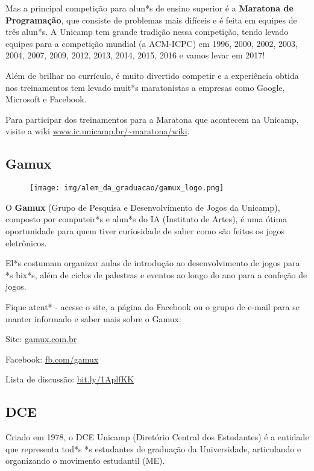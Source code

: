 Mas a principal competição para alun*s de ensino superior é a \textbf{Maratona
de Programação}, que consiste de problemas mais difíceis e é feita em equipes de
três alun*s. A Unicamp tem grande tradição nessa competição, tendo levado
equipes para a competição mundial (a ACM-ICPC) em 1996, 2000, 2002, 2003, 2004,
2007, 2009, 2012, 2013, 2014, 2015, 2016 e vamos levar em 2017!

Além de brilhar no currículo, é muito divertido competir e a experiência obtida
nos treinamentos tem levado muit*s maratonistas a empresas como Google,
Microsoft e Facebook.

Para participar dos treinamentos para a Maratona que acontecem na Unicamp,
visite a wiki \url{www.ic.unicamp.br/~maratona/wiki}.

\subsection{Gamux}

\begin{figure}[h!]
    \centering
    \texttt{[image: img/alem\_da\_graduacao/gamux\_logo.png]}
\end{figure}

O \textbf{Gamux} (Grupo de Pesquisa e Desenvolvimento de Jogos da Unicamp), composto por
computeir*s e alun*s do IA (Instituto de Artes), é uma ótima oportunidade para
quem tiver curiosidade de saber como são feitos os jogos eletrônicos.

El*s costumam organizar aulas de introdução ao desenvolvimento de jogos para *s bix*s,
além de ciclos de palestras e eventos ao longo do ano para a confeção de jogos.

Fique atent* - acesse o site, a página do Facebook ou o grupo de e-mail para se manter
informado e saber mais sobre o Gamux:

\begin{compactitemize}
    \item  Site: \url{gamux.com.br}
    \item  Facebook: \url{fb.com/gamux}
    \item  Lista de discussão: \url {bit.ly/1AplfKK}
\end{compactitemize}

\subsection{DCE}

Criado em 1978, o DCE Unicamp (Diretório Central dos Estudantes) é a entidade
que representa tod*s *s estudantes de graduação da Universidade, articulando e
organizando o movimento estudantil (ME).

